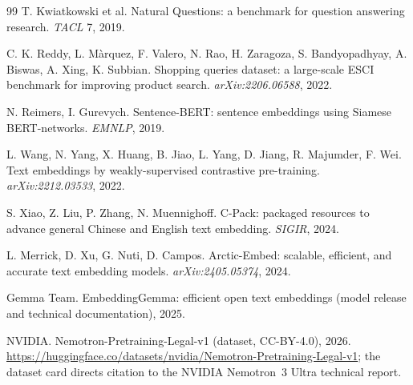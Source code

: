 \documentclass[11pt,letterpaper]{article}
\begin{document}
\begin{thebibliography}{99}
 T. Kwiatkowski et al. Natural Questions: a
benchmark for question answering research. \emph{TACL} 7, 2019.

 C. K. Reddy, L. Màrquez, F. Valero, N. Rao, H. Zaragoza,
S. Bandyopadhyay, A. Biswas, A. Xing, K. Subbian. Shopping queries dataset:
a large-scale ESCI benchmark for improving product search.
\emph{arXiv:2206.06588}, 2022.

 N. Reimers, I. Gurevych. Sentence-BERT: sentence
embeddings using Siamese BERT-networks. \emph{EMNLP}, 2019.

 L. Wang, N. Yang, X. Huang, B. Jiao, L. Yang,
D. Jiang, R. Majumder, F. Wei. Text embeddings by weakly-supervised
contrastive pre-training. \emph{arXiv:2212.03533}, 2022.

 S. Xiao, Z. Liu, P. Zhang, N. Muennighoff. C-Pack:
packaged resources to advance general Chinese and English text embedding.
\emph{SIGIR}, 2024.

 L. Merrick, D. Xu, G. Nuti, D. Campos. Arctic-Embed:
scalable, efficient, and accurate text embedding models.
\emph{arXiv:2405.05374}, 2024.

 Gemma Team. EmbeddingGemma: efficient open text
embeddings (model release and technical documentation), 2025.

 NVIDIA. Nemotron-Pretraining-Legal-v1 (dataset,
CC-BY-4.0), 2026.
\url{https://huggingface.co/datasets/nvidia/Nemotron-Pretraining-Legal-v1};
the dataset card directs citation to the NVIDIA Nemotron~3 Ultra technical
report.

\end{thebibliography}
\end{document}
